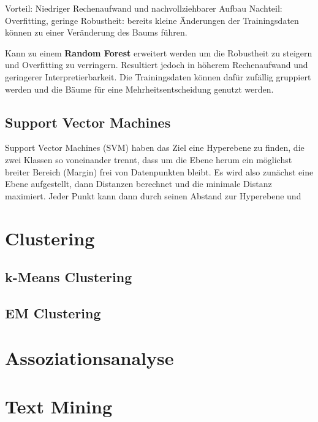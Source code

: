 \documentclass{article}
\begin{document}
Vorteil: Niedriger Rechenaufwand und nachvollziehbarer Aufbau 
Nachteil: Overfitting, geringe Robustheit: bereits kleine Änderungen der Trainingsdaten können zu einer Veränderung des Baums führen.


Kann zu einem \textbf{Random Forest} erweitert werden um die Robustheit zu steigern und Overfitting zu verringern.
Resultiert jedoch in höherem Rechenaufwand und geringerer Interpretierbarkeit.
Die Trainingsdaten können dafür zufällig gruppiert werden und die Bäume für eine Mehrheitsentscheidung genutzt werden.



\subsection{Support Vector Machines}
Support Vector Machines (SVM) haben das Ziel eine Hyperebene zu finden, die zwei Klassen so voneinander trennt,
dass um die Ebene herum ein möglichst breiter Bereich (Margin) frei von Datenpunkten bleibt.
Es wird also zunächst eine Ebene aufgestellt, dann Distanzen berechnet und die minimale Distanz maximiert.
Jeder Punkt kann dann durch seinen Abstand zur Hyperebene und

\section{Clustering}
\subsection{k-Means Clustering}
\subsection{EM Clustering}
\section{Assoziationsanalyse}
\section{Text Mining}
\end{document}
